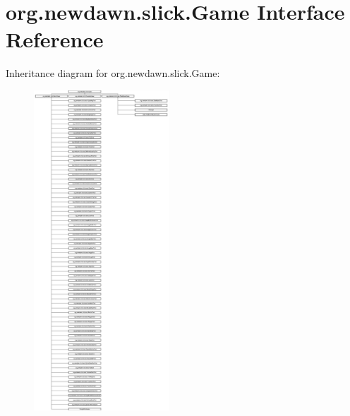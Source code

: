 \hypertarget{interfaceorg_1_1newdawn_1_1slick_1_1_game}{}\section{org.\+newdawn.\+slick.\+Game Interface Reference}
\label{interfaceorg_1_1newdawn_1_1slick_1_1_game}
Inheritance diagram for org.\+newdawn.\+slick.\+Game\+:\begin{figure}[H]
\begin{center}
\leavevmode
\includegraphics[height=12.000000cm]{interfaceorg_1_1newdawn_1_1slick_1_1_game}
\end{center}
\end{figure}
